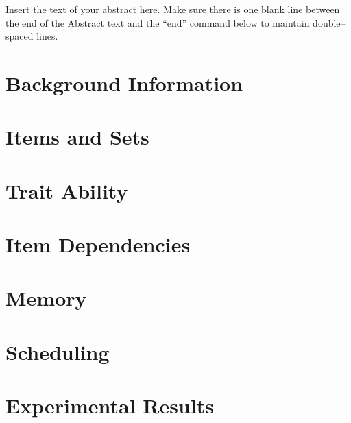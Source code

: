 \documentclass[12pt,letterpaper]{lsuetd}
\begin{document}
\renewenvironment{abstract}{{\hspace{-2.2em} \huge \textbf{\abstractname}} \par}{\pagebreak}
\begin{abstract}
\vspace{0.55ex}
\doublespacing
Insert the text of your abstract here.  Make sure there is one blank line between the end of the Abstract text and the ``end'' command below to maintain double--spaced lines.

\end{abstract}

\singlespacing
\setlength{\textfloatsep}{12pt plus 2pt minus 2pt}
\setlength{\intextsep}{6pt plus 2pt minus 2pt}
\chapter{Background Information}
\doublespacing

\pagebreak
\singlespacing
\chapter{Items and Sets}
\doublespacing

\pagebreak
\singlespacing
\chapter{Trait Ability}
\doublespacing

\pagebreak
\singlespacing
\chapter{Item Dependencies}
\doublespacing

\pagebreak
\singlespacing
\chapter{Memory}
\doublespacing

\pagebreak
\singlespacing
\chapter{Scheduling}
\doublespacing

\pagebreak
\singlespacing
\chapter{Experimental Results}
\doublespacing

\pagebreak
\singlespacing
%
\end{document}
